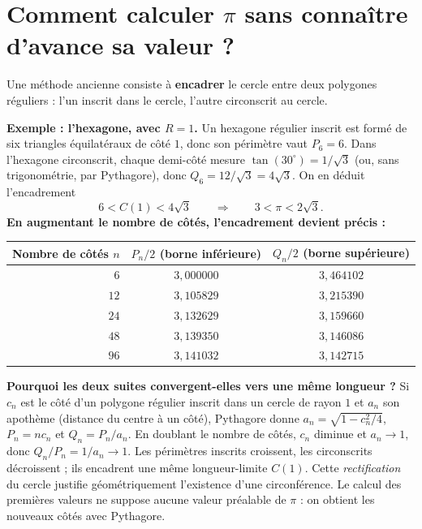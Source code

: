 \documentclass[../cours_spe_trigo.tex]{subfiles}
\begin{document}
\section{Comment calculer $\pi$ sans connaître d'avance sa valeur ?}
Une méthode ancienne consiste à \textbf{encadrer} le cercle entre deux polygones réguliers : l'un inscrit dans le cercle, l'autre circonscrit au cercle.
\begin{center}
\end{center}
\textbf{Exemple : l'hexagone, avec $R=1$.} Un hexagone régulier inscrit est formé de six triangles équilatéraux de côté $1$, donc son périmètre vaut $P_6=6$. Dans l'hexagone circonscrit, chaque demi-côté mesure $\tan(30^\circ)=1/\sqrt3$ (ou, sans trigonométrie, par Pythagore), donc $Q_6=12/\sqrt3=4\sqrt3$. On en déduit l'encadrement
\[
6<C(1)<4\sqrt3\qquad\Longrightarrow\qquad 3<\pi<2\sqrt3.
\]
\textbf{En augmentant le nombre de côtés, l'encadrement devient précis :}
\begin{center}
\begin{tabular}{rcc}
\toprule
Nombre de côtés $n$ & $P_n/2$ (borne inférieure) & $Q_n/2$ (borne supérieure) \\
\midrule
$6$ & $3{,}000000$ & $3{,}464102$\\
$12$ & $3{,}105829$ & $3{,}215390$\\
$24$ & $3{,}132629$ & $3{,}159660$\\
$48$ & $3{,}139350$ & $3{,}146086$\\
$96$ & $3{,}141032$ & $3{,}142715$\\
\bottomrule
\end{tabular}
\end{center}
\begin{demonstration}
\textbf{Pourquoi les deux suites convergent-elles vers une même longueur ?} Si $c_n$ est le côté d'un polygone régulier inscrit dans un cercle de rayon $1$ et $a_n$ son apothème (distance du centre à un côté), Pythagore donne $a_n=\sqrt{1-c_n^2/4}$, $P_n=nc_n$ et $Q_n=P_n/a_n$. En doublant le nombre de côtés, $c_n$ diminue et $a_n\to1$, donc $Q_n/P_n=1/a_n\to1$. Les périmètres inscrits croissent, les circonscrits décroissent ; ils encadrent une même longueur-limite $C(1)$. Cette \emph{rectification} du cercle justifie géométriquement l'existence d'une circonférence. Le calcul des premières valeurs ne suppose aucune valeur préalable de $\pi$ : on obtient les nouveaux côtés avec Pythagore.
\end{demonstration}
\end{document}
